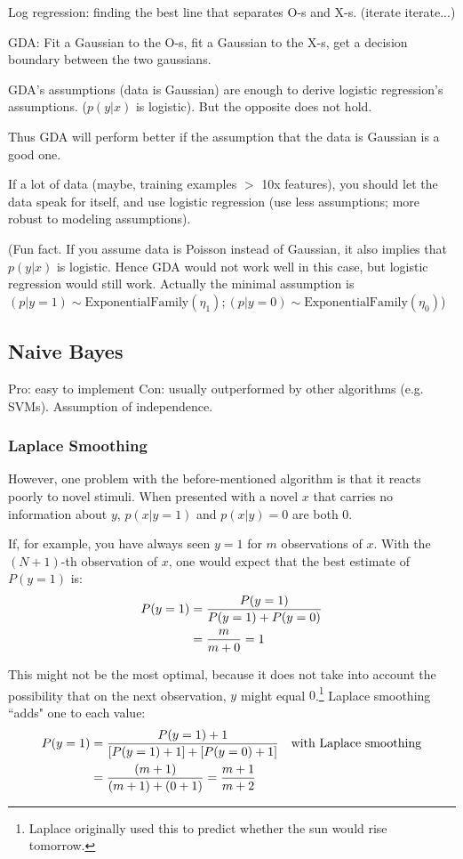 \documentclass[letterpaper,10pt]{article}
\begin{document}
Log regression: finding the best line that separates O-s and X-s. (iterate iterate...)

GDA: Fit a Gaussian to the O-s, fit a Gaussian to the X-s, get a decision boundary between the two gaussians.

GDA's assumptions (data is Gaussian) are enough to derive logistic regression's assumptions. ($p(y|x)$ is logistic). But the opposite does not hold.

Thus GDA will perform better if the assumption that the data is Gaussian is a good one.

If a lot of data (maybe, training examples $>$ 10x features), you should let the data speak for itself, and use logistic regression (use less assumptions; more robust to modeling assumptions).

(Fun fact. If you assume data is Poisson instead of Gaussian, it also implies that $p(y|x)$ is logistic. Hence GDA would not work well in this case, but logistic regression would still work. Actually the minimal assumption is $(p|y=1) \sim \text{ExponentialFamily} (\eta_1); (p|y=0) \sim \text{ExponentialFamily} (\eta_0)$)

\subsection{Naive Bayes}

Pro: easy to implement
Con: usually outperformed by other algorithms (e.g. SVMs). Assumption of independence.

\subsubsection{Laplace Smoothing}
However, one problem with the before-mentioned algorithm is that it reacts poorly to novel stimuli. When presented with a novel $x$ that carries no information about $y$, $p(x|y=1)$ and $p(x|y)=0$ are both 0.

If, for example, you have always seen $y=1$ for $m$ observations of $x$. With the $(N+1)$-th observation of $x$, one would expect that the best estimate of $P(y=1)$ is:
\begin{align}
P(y=1) &= \frac{P(y=1)}{P(y=1) + P(y=0)} \\
&= \frac{m}{m+0} = 1 \notag
\end{align}

This might not be the most optimal, because it does not take into account the possibility that on the next observation, $y$ might equal $0$.\footnote{Laplace originally used this to predict whether the sun would rise tomorrow.} Laplace smoothing ``adds" one to each value:
\begin{align}
P(y=1) &= \frac{P(y=1)+1}{[P(y=1)+1] + [P(y=0)+1]} \quad \text{with Laplace smoothing}\\
&= \frac{(m+1)}{(m+1)+(0+1)} = \frac{m+1}{m+2} \notag
\end{align}
\end{document}
